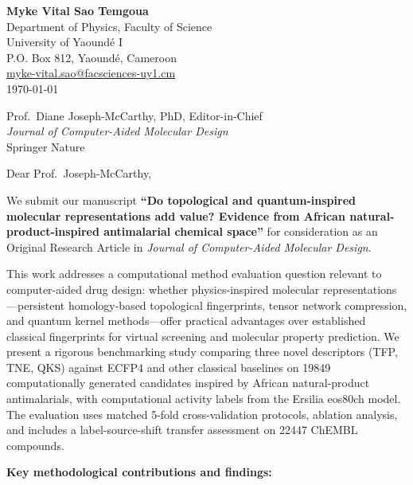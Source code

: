 \documentclass[9pt,a4paper]{article}
\begin{document}
\fontsize{9}{10.5}\selectfont

\begin{flushleft}
\textbf{Myke Vital Sao Temgoua} \\
Department of Physics, Faculty of Science \\
University of Yaound\'{e} I \\
P.O. Box 812, Yaound\'{e}, Cameroon \\
\href{mailto:myke-vital.sao@facsciences-uy1.cm}{myke-vital.sao@facsciences-uy1.cm} \\[0.8em]
\today
\end{flushleft}

\begin{flushleft}
Prof.\ Diane Joseph-McCarthy, PhD, Editor-in-Chief \\
\textit{Journal of Computer-Aided Molecular Design} \\
Springer Nature
\end{flushleft}

\vspace{0.2em}

\noindent Dear Prof.\ Joseph-McCarthy,

We submit our manuscript \textbf{``Do topological and quantum-inspired molecular representations add value? Evidence from African natural-product-inspired antimalarial chemical space''} for consideration as an Original Research Article in \textit{Journal of Computer-Aided Molecular Design}.

This work addresses a computational method evaluation question relevant to computer-aided drug design: whether physics-inspired molecular representations—persistent homology-based topological fingerprints, tensor network compression, and quantum kernel methods—offer practical advantages over established classical fingerprints for virtual screening and molecular property prediction. We present a rigorous benchmarking study comparing three novel descriptors (TFP, TNE, QKS) against ECFP4 and other classical baselines on \num{19849} computationally generated candidates inspired by African natural-product antimalarials, with computational activity labels from the Ersilia eos80ch model. The evaluation uses matched 5-fold cross-validation protocols, ablation analysis, and includes a label-source-shift transfer assessment on \num{22447} ChEMBL compounds.

\noindent\textbf{Key methodological contributions and findings:}
\end{document}
